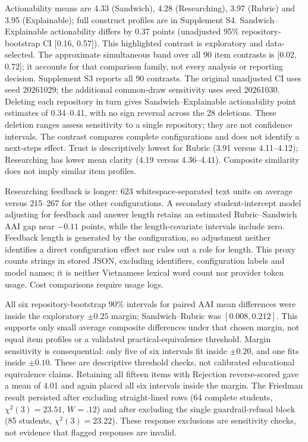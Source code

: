 \documentclass[runningheads]{llncs}
\begin{document}
Actionability means are 4.33 (Sandwich), 4.28 (Researching), 3.97 (Rubric) and 3.95 (Explainable); full construct profiles are in Supplement S4. Sandwich--Explainable actionability differs by 0.37 points (unadjusted 95\% repository-bootstrap CI [0.16, 0.57]). This highlighted contrast is exploratory and data-selected. The approximate simultaneous band over all 90 item contrasts is [0.02, 0.72]; it accounts for that comparison family, not every analysis or reporting decision. Supplement S3 reports all 90 contrasts. The original unadjusted CI uses seed 20261029; the additional common-draw sensitivity uses seed 20261030. Deleting each repository in turn gives Sandwich--Explainable actionability point estimates of 0.34--0.41, with no sign reversal across the 28 deletions. These deletion ranges assess sensitivity to a single repository; they are not confidence intervals. The contrast compares complete configurations and does not identify a next-steps effect. Trust is descriptively lowest for Rubric (3.91 versus 4.11--4.12); Researching has lower mean clarity (4.19 versus 4.36--4.41). Composite similarity does not imply similar item profiles.

Researching feedback is longer: 623 whitespace-separated text units on average versus 215--267 for the other configurations. A secondary student-intercept model adjusting for feedback and answer length retains an estimated Rubric--Sandwich AAI gap near $-0.11$ points, while the length-covariate intervals include zero. Feedback length is generated by the configuration, so adjustment neither identifies a direct configuration effect nor rules out a role for length. This proxy counts strings in stored JSON, excluding identifiers, configuration labels and model names; it is neither Vietnamese lexical word count nor provider token usage. Cost comparisons require usage logs.

All six repository-bootstrap 90\% intervals for paired AAI mean differences were inside the exploratory $\pm0.25$ margin; Sandwich--Rubric was $[0.008,0.212]$. This supports only small average composite differences under that chosen margin, not equal item profiles or a validated practical-equivalence threshold. Margin sensitivity is consequential: only five of six intervals fit inside $\pm0.20$, and one fits inside $\pm0.10$. These are descriptive threshold checks, not calibrated educational equivalence claims. Retaining all fifteen items with Rejection reverse-scored gave a mean of 4.01 and again placed all six intervals inside the margin. The Friedman result persisted after excluding straight-lined rows (64 complete students, $\chi^2(3)=23.51$, $W=.12$) and after excluding the single guardrail-refusal block (85 students, $\chi^2(3)=23.22$). These response exclusions are sensitivity checks, not evidence that flagged responses are invalid.
\end{document}
